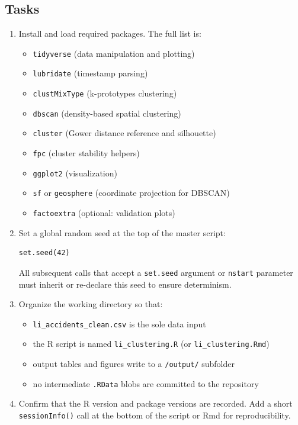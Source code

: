 \documentclass[11pt]{article}
\begin{document}
\subsection{Tasks}

\begin{enumerate}
  \item Install and load required packages. The full list is:
  \begin{itemize}
    \item \texttt{tidyverse} (data manipulation and plotting)
    \item \texttt{lubridate} (timestamp parsing)
    \item \texttt{clustMixType} (k-prototypes clustering)
    \item \texttt{dbscan} (density-based spatial clustering)
    \item \texttt{cluster} (Gower distance reference and silhouette)
    \item \texttt{fpc} (cluster stability helpers)
    \item \texttt{ggplot2} (visualization)
    \item \texttt{sf} or \texttt{geosphere} (coordinate projection for DBSCAN)
    \item \texttt{factoextra} (optional: validation plots)
  \end{itemize}

  \item Set a global random seed at the top of the master script:
  \begin{verbatim}
set.seed(42)
  \end{verbatim}
  All subsequent calls that accept a \texttt{set.seed} argument or \texttt{nstart} parameter must inherit or re-declare this seed to ensure determinism.

  \item Organize the working directory so that:
  \begin{itemize}
    \item \texttt{li\_accidents\_clean.csv} is the sole data input
    \item the R script is named \texttt{li\_clustering.R} (or \texttt{li\_clustering.Rmd})
    \item output tables and figures write to a \texttt{/output/} subfolder
    \item no intermediate \texttt{.RData} blobs are committed to the repository
  \end{itemize}

  \item Confirm that the R version and package versions are recorded. Add a short \texttt{sessionInfo()} call at the bottom of the script or Rmd for reproducibility.
\end{enumerate}
\end{document}

